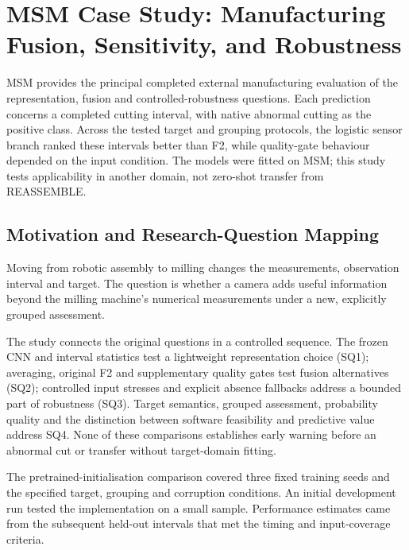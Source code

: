 \chapter{MSM Case Study: Manufacturing Fusion, Sensitivity, and Robustness}
\label{ch:msm}

MSM provides the principal completed external manufacturing evaluation of the
representation, fusion and controlled-robustness questions. Each prediction concerns a
completed cutting interval, with native abnormal cutting as the positive class. Across
the tested target and grouping protocols, the logistic sensor branch ranked these
intervals better than F2, while quality-gate behaviour depended on the input condition.
The models were fitted on MSM; this study tests applicability in another domain, not
zero-shot transfer from REASSEMBLE.

\section{Motivation and Research-Question Mapping}
Moving from robotic assembly to milling changes the measurements, observation interval
and target. The question is whether a camera adds useful information beyond the milling
machine's numerical measurements under a new, explicitly grouped assessment.

The study connects the original questions in a controlled sequence. The frozen CNN and
interval statistics test a lightweight representation choice (SQ1); averaging, original
F2 and supplementary quality gates test fusion alternatives (SQ2); controlled input
stresses and explicit absence fallbacks address a bounded part of robustness (SQ3).
Target semantics, grouped assessment, probability quality and the distinction between
software feasibility and predictive value address SQ4. None of these comparisons
establishes early warning before an abnormal cut or transfer without target-domain
fitting.

The pretrained-initialisation comparison covered three fixed training seeds and the
specified target, grouping and corruption conditions. An initial development run tested
the implementation on a small sample. Performance estimates came from the subsequent
held-out intervals that met the timing and input-coverage criteria.

